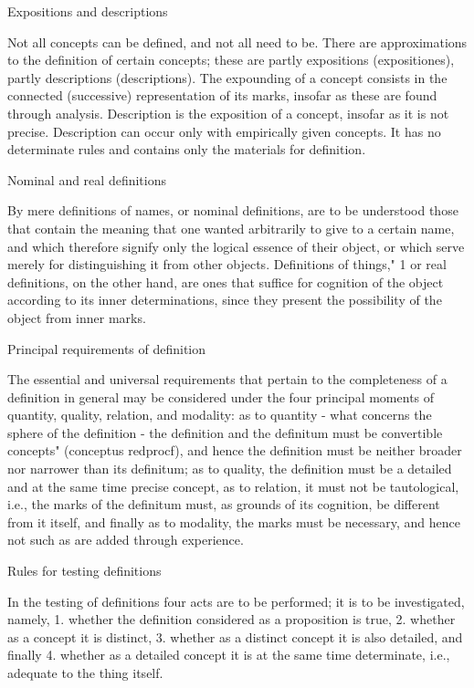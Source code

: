     Expositions and descriptions

    Not all concepts can be defined, and not all need to be.
    There are approximations to the definition of certain concepts;
    these are partly expositions (expositiones), partly descriptions (descriptions).
    The expounding of a concept consists in the connected (successive)
    representation of its marks, insofar as these are found through analysis.
    Description is the exposition of a concept, insofar as it is not precise.
    Description can occur only with empirically given concepts. It has no
    determinate rules and contains only the materials for definition.

    Nominal and real definitions

    By mere definitions of names, or nominal definitions, are to be understood
    those that contain the meaning that one wanted arbitrarily to give to a
    certain name, and which therefore signify only the logical essence of their
    object, or which serve merely for distinguishing it from other objects.
    Definitions of things," 1 or real definitions, on the other hand, are ones that
    suffice for cognition of the object according to its inner determinations,
    since they present the possibility of the object from inner marks.

    Principal requirements of definition

    The essential and universal requirements that pertain to the completeness
    of a definition in general may be considered under the four principal
    moments of quantity, quality, relation, and modality:
    as to quantity - what concerns the sphere of the definition - the definition
    and the definitum must be convertible concepts" (conceptus redprocf), and hence
    the definition must be neither broader nor narrower than its definitum;
    as to quality, the definition must be
    a detailed and at the same time precise concept,
    as to relation, it must not be tautological,
    i.e., the marks of the definitum must, as grounds of its cognition,
    be different from it itself, and finally
    as to modality, the marks must be necessary, and
    hence not such as are added through experience.

    Rules for testing definitions

    In the testing of definitions four acts are to be performed;
    it is to be investigated, namely,
    1.  whether the definition considered as a proposition is true,
    2.  whether as a concept it is distinct,
    3.  whether as a distinct concept it is also detailed, and finally
    4.  whether as a detailed concept it is at the same time determinate,
        i.e., adequate to the thing itself.

